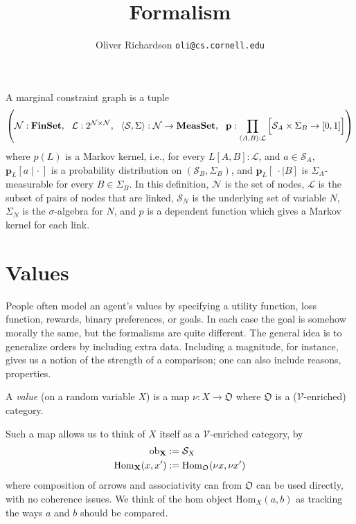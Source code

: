 \documentclass{article}
\title{Formalism}
\author{Oliver Richardson  \texttt{oli@cs.cornell.edu}}
\begin{document}
	
	
	\section{}
	\begin{defn}\label{def:mcg}
		A marginal constraint graph is a tuple 
		\[ \left(\mathcal N : \mathbf{FinSet},~~\mathcal L : 2^{\cal N \times N},~~ \langle\mathcal S, \Sigma\rangle : \mathcal N \to \mathbf{MeasSet}, ~~\mathbf p : \prod_{(A,B): \mathcal L} \left[ \Big. \mathcal S_A \times \Sigma_B \to [0,1]\right] \right) \]
		where $p(L)$ is a Markov kernel, i.e., for every $L[A,B] : \mathcal L$, and $a \in \mathcal S_A$, $\mathbf p_L[a \mid \cdot~]$ is a probability distribution on $(\mathcal S_B, \Sigma_B)$, and $\mathbf p_L[~\cdot \mid B]$ is $\Sigma_A$-measurable for every $B \in \Sigma_B$. In this definition, $\mathcal N$ is the set of nodes, $\mathcal L$ is the subset of pairs of nodes that are linked, $\mathcal S_N$ is the underlying set of variable $N$, $\Sigma_N$ is the $\sigma$-algebra for $N$, and $p$ is a dependent function which gives a Markov kernel for each link.
	\end{defn}
	
	\section{Values}
	
	People often model an agent's values by specifying a utility function, loss function, rewards, binary preferences, or goals. In each case the goal is somehow morally the same, but the formalisms are quite different.
	The general idea is to generalize orders by including extra data. Including a magnitude, for instance, gives us a notion of the strength of a comparison; one can also include reasons, properties. 
	
	\begin{defn}
		A \textit{value} (on a random variable $X$) is a map $\nu : X  \to \mathfrak O$ where $\mathfrak O$ is a ($\mathcal V$-enriched) category.
	\end{defn}

	Such a map allows us to think of $X$ itself as a $\mathcal V$-enriched category, by
	\begin{align*}
	\mathrm{ob}_{\bf X} &:= \mathcal S_X \\
	\mathrm{Hom}_{\bf X}(x, x') &:= \mathrm{Hom}_{\mathfrak O}(\nu x, \nu x')
	\end{align*}
	where composition of arrows and associativity can from $\mathfrak O$ can be used directly, with no coherence issues.  We think of the hom object $\mathrm{Hom}_X(a,b)$ as tracking the ways $a$ and $b$ should be compared.
	
\end{document}
